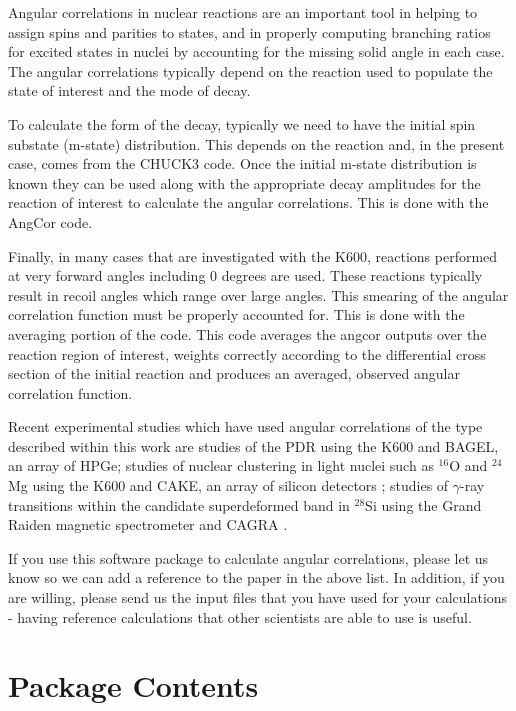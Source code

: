 \documentclass[a4paper,10pt]{article}
\begin{document}
Angular correlations in nuclear reactions are an important tool in helping to assign spins and parities to states, and in properly computing branching ratios for excited states in nuclei by accounting for the missing solid angle in each case. The angular correlations typically depend on the reaction used to populate the state of interest and the mode of decay.

To calculate the form of the decay, typically we need to have the initial spin substate (m-state) distribution. This depends on the reaction and, in the present case, comes from the CHUCK3 code. Once the initial m-state distribution is known they can be used along with the appropriate decay amplitudes for the reaction of interest to calculate the angular correlations. This is done with the AngCor code.

Finally, in many cases that are investigated with the K600, reactions performed at very forward angles including 0 degrees are used. These reactions typically result in recoil angles which range over large angles. This smearing of the angular correlation function must be properly accounted for. This is done with the averaging portion of the code. This code averages the angcor outputs over the reaction region of interest, weights correctly according to the differential cross section of the initial reaction and produces an averaged, observed angular correlation function.

Recent experimental studies which have used angular correlations of the type described within this work are studies of the PDR using the K600 and BAGEL, an array of HPGe; studies of nuclear clustering in light nuclei such as $^{16}$O \cite{dummy} and $^{24}$Mg \cite{dummy} using the K600 and CAKE, an array of silicon detectors \cite{dummy}; studies of $\gamma$-ray transitions within the candidate superdeformed band in $^{28}$Si using the Grand Raiden magnetic spectrometer and CAGRA \cite{dummy}.

If you use this software package to calculate angular correlations, please let us know so we can add a reference to the paper in the above list. In addition, if you are willing, please send us the input files that you have used for your calculations - having reference calculations that other scientists are able to use is useful.

\section{Package Contents}
\end{document}
